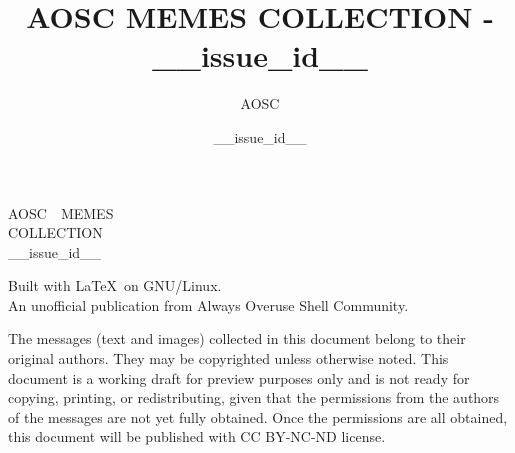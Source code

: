 \documentclass[10pt,a4paper]{report}
\title{AOSC MEMES COLLECTION - __issue_id__}
\author{AOSC}
\date{__issue_id__}
\begin{document}
\begin{titlepage}
	\leavevmode
	\vskip 50mm
	\begin{center}
        \rmfamily{}
		\parbox{75mm}{
            \center\rmfamily{}\Huge\baselineskip=40pt
            A\hfill O\hfill S\hfill C~~\hfill M\hfill E\hfill M\hfill E\hfill S\\
            C\hfill O\hfill L\hfill L\hfill E\hfill C\hfill T\hfill I\hfill O\hfill N\\
            __issue_id__
        }\par
		\vfill
        \sffamily
		\normalsize
        Built with \LaTeX~on GNU/Linux.\\
        An unofficial publication from Always Overuse Shell Community.
	\end{center}
\end{titlepage}




\begin{multicols*}{2}
	
\end{multicols*}




\clearpage
\leavevmode
\vfill
\small
\sffamily
The messages (text and images) collected in this document belong to their original authors.
They may be copyrighted unless otherwise noted.
This document is a working draft for preview purposes only and is not ready for copying, printing, or redistributing,
given that the permissions from the authors of the messages are not yet fully obtained.
Once the permissions are all obtained, this document will be published with CC BY-NC-ND license.
\end{document}
